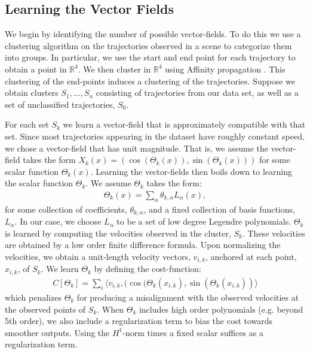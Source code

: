 \documentclass[letterpaper,10pt,conference]{ieeeconf}
\begin{document}
  \subsection{Learning the Vector Fields}
 We begin by identifying the number of possible vector-fields.
  To do this we use a clustering algorithm on the trajectories observed in a scene to categorize them into groups.
  In particular, we use the start and end point for each trajectory to obtain a point in $\mathbb{R}^4$.
  We then cluster in $\mathbb{R}^4$ using Affinity propagation \cite{FreyDueck2007}.
  This clustering of the end-points induces a clustering of the trajectories.
  Suppose we obtain clusters $S_1, \dots, S_n$ consisting of trajectories from our data set, as well as a set of unclassified trajectories, $S_0$.
  
  For each set $S_k$ we learn a vector-field that is approximately compatible with that set.
  Since most trajectories appearing in the dataset have roughly constant speed, we chose a vector-field that has unit magnitude. 
  That is, we assume the vector-field takes the form $X_k(x) = \left( \cos( \Theta_k(x) ) , \sin(\Theta_k(x)) \right)$ for some scalar function $\Theta_k(x)$.
  Learning the vector-fields then boils down to learning the scalar function $\Theta_k$.
  We assume $\Theta_k$ takes the form:
  \begin{align*}
  	\Theta_k(x) = \sum_{\alpha} \theta_{k,\alpha} L_{\alpha}(x),
  \end{align*}
  for some collection of coefficients, $\theta_{k,\alpha}$, and a fixed collection of basis functions, $L_{\alpha}$.
  In our case, we choose $L_{\alpha}$ to be a set of low degree Legendre polynomials.
 $\Theta_k$ is learned by computing the velocities observed in the cluster, $S_k$.
  These velocities are obtained by a low order finite difference formula.
  Upon normalizing the velocities, we obtain a unit-length velocity vectors, $v_{i,k}$, anchored at each point, $x_{i,k}$, of $S_k$.
  We learn $\Theta_k$ by defining the cost-function:
  \begin{align*}
  	C[ \Theta_k] = \sum_i \langle v_{i,k} , ( \cos(\Theta_k( x_{i,k}) , \sin( \Theta_k( x_{i,k} ) ) \rangle
  \end{align*}
  which penalizes $\Theta_k$ for producing a misalignment with the observed velocities at the observed points of $S_k$.
  When $\Theta_{k}$ includes high order polynomials (e.g. beyond 5th order), we also include a regularization term to bias the cost towards smoother outputs.
  Using the $H^1$-norm times a fixed scalar suffices as a regularization term. 
  
\end{document}

